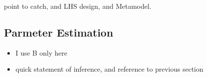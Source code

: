 %
%

%
{\color{red}
point to catch, and LHS design, and Metamodel.
}

%
\subsection{Parmeter Estimation}
%
\begin{itemize}
	\item I use B only here
	\item quick statement of inference, and reference to previous section
\end{itemize}

